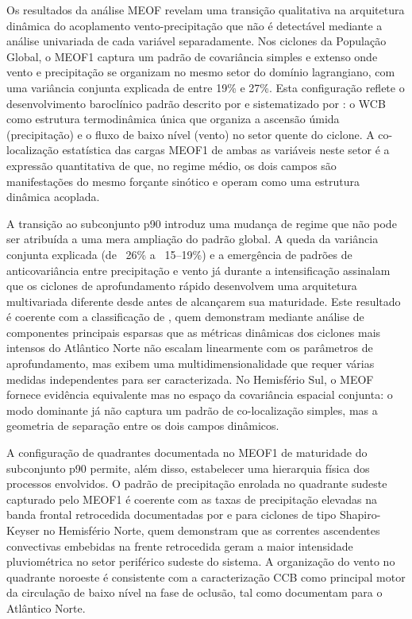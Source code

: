 Os resultados da análise MEOF revelam uma transição qualitativa na arquitetura dinâmica do acoplamento vento-precipitação que não é detectável mediante a análise univariada de cada variável separadamente.
Nos ciclones da População Global, o MEOF1 captura um padrão de covariância simples e extenso onde vento e precipitação se organizam no mesmo setor do domínio lagrangiano, com uma variância conjunta explicada de entre 19\% e 27\%.
Esta configuração reflete o desenvolvimento baroclínico padrão descrito por \citet{bjerknes1922life} e sistematizado por \citet{browning1986conceptual}: o WCB como estrutura termodinâmica única que organiza a ascensão úmida (precipitação) e o fluxo de baixo nível (vento) no setor quente do ciclone.
A co-localização estatística das cargas MEOF1 de ambas as variáveis neste setor é a expressão quantitativa de que, no regime médio, os dois campos são manifestações do mesmo forçante sinótico e operam como uma estrutura dinâmica acoplada.

A transição ao subconjunto p90 introduz uma mudança de regime que não pode ser atribuída a uma mera ampliação do padrão global.
A queda da variância conjunta explicada (de ~26\% a ~15--19\%) e a emergência de padrões de anticovariância entre precipitação e vento já durante a intensificação assinalam que os ciclones de aprofundamento rápido desenvolvem uma arquitetura multivariada diferente desde antes de alcançarem sua maturidade.
Este resultado é coerente com a classificação de \citet{corner2025classification}, quem demonstram mediante análise de componentes principais esparsas que as métricas dinâmicas dos ciclones mais intensos do Atlântico Norte não escalam linearmente com os parâmetros de aprofundamento, mas exibem uma multidimensionalidade que requer várias medidas independentes para ser caracterizada.
No Hemisfério Sul, o MEOF fornece evidência equivalente mas no espaço da covariância espacial conjunta: o modo dominante já não captura um padrão de co-localização simples, mas a geometria de separação entre os dois campos dinâmicos.

A configuração de quadrantes documentada no MEOF1 de maturidade do subconjunto p90 permite, além disso, estabelecer uma hierarquia física dos processos envolvidos.
O padrão de precipitação enrolada no quadrante sudeste capturado pelo MEOF1 é coerente com as taxas de precipitação elevadas na banda frontal retrocedida documentadas por \citet{clark2005sting} e \citet{oertel2021warm} para ciclones de tipo Shapiro-Keyser no Hemisfério Norte, quem demonstram que as correntes ascendentes convectivas embebidas na frente retrocedida geram a maior intensidade pluviométrica no setor periférico sudeste do sistema.
A organização do vento no quadrante noroeste é consistente com a caracterização CCB como principal motor da circulação de baixo nível na fase de oclusão, tal como documentam \citet{eisenstein2023identification} para o Atlântico Norte.

